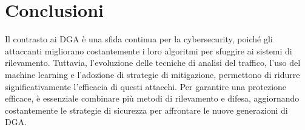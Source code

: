 \section*{Conclusioni}
Il contrasto ai DGA è una sfida continua per la cybersecurity, 
poiché gli attaccanti migliorano costantemente i loro algoritmi 
per sfuggire ai sistemi di rilevamento. Tuttavia, l'evoluzione 
delle tecniche di analisi del traffico, l'uso del machine learning e 
l'adozione di strategie di mitigazione, permettono di ridurre 
significativamente l'efficacia di questi attacchi. Per garantire una 
protezione efficace, è essenziale combinare più metodi di rilevamento e 
difesa, aggiornando costantemente le strategie di sicurezza per 
affrontare le nuove generazioni di DGA.
